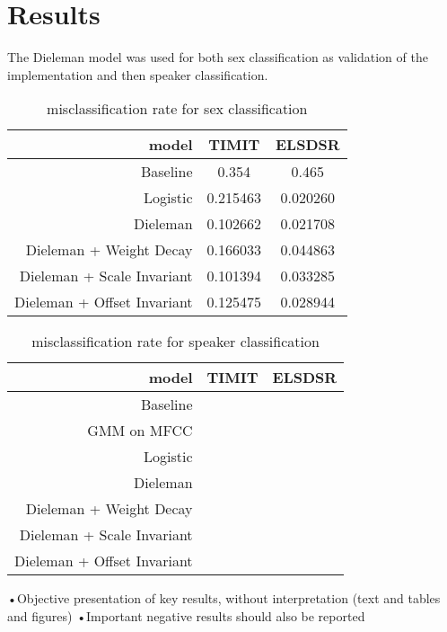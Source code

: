 \section{Results}

The Dieleman model was used for both sex classification as validation of the implementation and then speaker classification.

\begin{table}[H]
\centering
\begin{tabular}{r|c|c}
	model & TIMIT & ELSDSR \\ \hline
	Baseline & 0.354 & 0.465 \\
	Logistic & 0.215463 & 0.020260 \\
	Dieleman & 0.102662 & 0.021708 \\
	Dieleman + Weight Decay     & 0.166033 & 0.044863 \\
	Dieleman + Scale Invariant  & 0.101394 & 0.033285 \\
	Dieleman + Offset Invariant & 0.125475 & 0.028944
\end{tabular}
\caption{misclassification rate for sex classification}
\end{table}

\begin{table}[H]
\centering
\begin{tabular}{r|c|c}
	model & TIMIT & ELSDSR \\ \hline
	Baseline & \\
	GMM on MFCC & \\
	Logistic & \\
	Dieleman & \\
	Dieleman + Weight Decay     & \\
	Dieleman + Scale Invariant  & \\
	Dieleman + Offset Invariant &
\end{tabular}
\caption{misclassification rate for speaker classification}
\end{table}

•Objective presentation of key results, without interpretation (text and tables
and figures)
•Important negative results should also be reported

